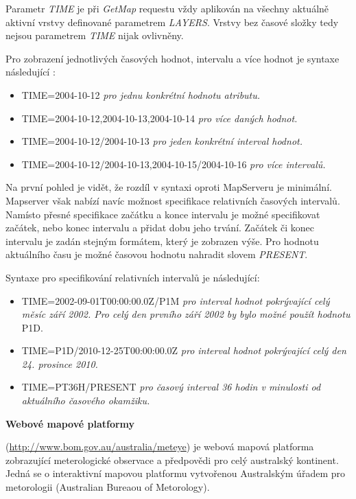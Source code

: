 Parametr \textit{TIME} je při \textit{GetMap} requestu vždy aplikován
na všechny aktuálně aktivní vrstvy definované parametrem
\textit{LAYERS}. Vrstvy bez časové složky tedy nejsou parametrem
\textit{TIME} nijak ovlivněny.

Pro zobrazení jednotlivých časových hodnot, intervalu a více hodnot je
syntaxe následující \cite{geoserver-time}:

\begin{itemize}
	\item TIME=2004-10-12 \textit{pro jednu konkrétní hodnotu
atributu.}
	\item TIME=2004-10-12,2004-10-13,2004-10-14 \textit{pro více
daných hodnot.}
	\item TIME=2004-10-12/2004-10-13 \textit{pro jeden konkrétní
interval hodnot.}
	\item TIME=2004-10-12/2004-10-13,2004-10-15/2004-10-16
\textit{pro více intervalů.}
\end{itemize}

Na první pohled je vidět, že rozdíl v syntaxi oproti MapServeru je
minimální. Mapserver však nabízí navíc možnost specifikace relativních
časových intervalů. Namísto přesné specifikace začátku a konce
intervalu je možné specifikovat začátek, nebo konec intervalu a přidat
dobu jeho trvání. Začátek či konec intervalu je zadán stejným
formátem, který je zobrazen výše. Pro hodnotu aktuálního času je možné
časovou hodnotu nahradit slovem \textit{PRESENT}.

Syntaxe pro specifikování relativních intervalů je
následující\cite{geoserver-time}:

\begin{itemize}
	\item TIME=2002-09-01T00:00:00.0Z/P1M \textit{pro interval
hodnot pokrývající celý měsíc září 2002. Pro celý den prvního září
2002 by bylo možné použít hodnotu} P1D.
	\item TIME=P1D/2010-12-25T00:00:00.0Z \textit{pro interval
hodnot pokrývající celý den 24. prosince 2010.}
	\item TIME=PT36H/PRESENT \textit{pro časový interval 36 hodin
v minulosti od aktuálního časového okamžiku.}
\end{itemize}

\bigskip
\noindent \textbf{Webové mapové platformy}

(\url{http://www.bom.gov.au/australia/meteye}) je webová mapová platforma
zobrazující meterologické observace a předpovědi pro celý australský
kontinent. Jedná se o interaktivní mapovou platformu vytvořenou
Australským úřadem pro metorologii (Australian Bureaou of Metorology).

